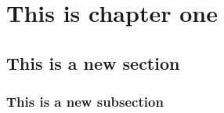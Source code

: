 \chapter{This is chapter one}
\section{This is a new section}
\subsection{This is a new subsection}
